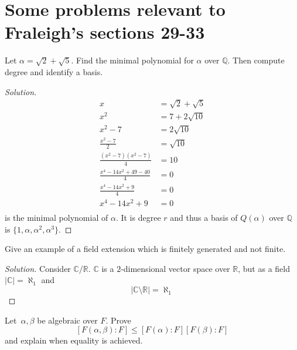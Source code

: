 \section{Some problems relevant to Fraleigh's sections 29-33}
\begin{prob}
    Let $\alpha = \sqrt 2 + \sqrt 5$. Find the minimal 
    polynomial for $\alpha$ over $\mathbb Q$.
    Then compute degree and identify a basis.
\end{prob}
\begin{proof}[Solution]
    \begin{align*}
        x &= \sqrt 2 + \sqrt 5 \\ 
        x^2 &= 7 + 2\sqrt{10} \\ 
        x^2 - 7 &= 2\sqrt{10} \\ 
        \frac{x^2-7}{2} &= \sqrt{10} \\ 
        \frac{(x^2-7)(x^2-7)}{4} &= 10 \\ 
        \frac{x^4 -14x^2 + 49 - 40}{4} &= 0 \\ 
        \frac{x^4 - 14x^2 + 9}{4} &= 0 \\ 
        x^4 - 14x^2 + 9 &= 0 \\ 
    \end{align*}
    is the minimal polynomial of $\alpha$. 
    It is degree $r$ and thus a basis of 
    $Q(\alpha)$ over $\mathbb Q$ is 
    $\{1, \alpha, \alpha^2, \alpha^3\}$.
\end{proof}
\begin{prob}
    Give an example of a field extension which is finitely generated 
    and not finite.
\end{prob}
\begin{proof}[Solution]
    Consider $\mathbb C/\mathbb R$. $\mathbb C$ is a 
    $2$-dimensional vector space over $\mathbb R$, but 
    as a field $|\mathbb C| = \aleph_1$ and 
    \[
        |\mathbb C\setminus \mathbb R| = \aleph_1
    \]
\end{proof}
\begin{prob}
    Let $\alpha, \beta$ be algebraic over $F$. 
    Prove 
    \[
        [F(\alpha,\beta):F] \leq [F(\alpha):F][F(\beta):F]
    \]
    and explain when equality is achieved.
\end{prob}
